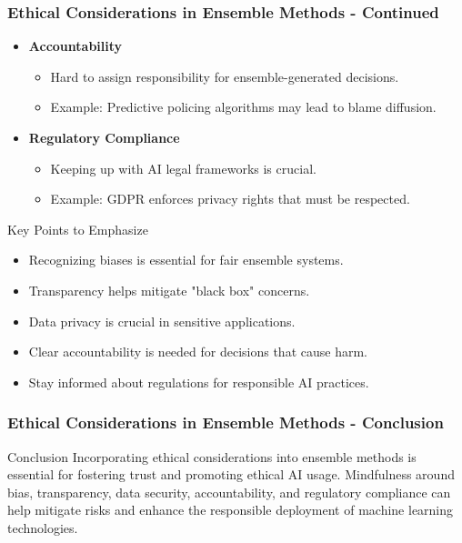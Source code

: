 \documentclass[aspectratio=169]{beamer}
\begin{document}
\begin{frame}[fragile]
    \frametitle{Ethical Considerations in Ensemble Methods - Continued}
    \begin{itemize}
        \item \textbf{Accountability}
        \begin{itemize}
            \item Hard to assign responsibility for ensemble-generated decisions.
            \item Example: Predictive policing algorithms may lead to blame diffusion.
        \end{itemize}
        
        \item \textbf{Regulatory Compliance}
        \begin{itemize}
            \item Keeping up with AI legal frameworks is crucial.
            \item Example: GDPR enforces privacy rights that must be respected.
        \end{itemize}
    \end{itemize}
    
    \begin{block}{Key Points to Emphasize}
        \begin{itemize}
            \item Recognizing biases is essential for fair ensemble systems.
            \item Transparency helps mitigate "black box" concerns.
            \item Data privacy is crucial in sensitive applications.
            \item Clear accountability is needed for decisions that cause harm.
            \item Stay informed about regulations for responsible AI practices.
        \end{itemize}
    \end{block}
\end{frame}

\begin{frame}[fragile]
    \frametitle{Ethical Considerations in Ensemble Methods - Conclusion}
    \begin{block}{Conclusion}
        Incorporating ethical considerations into ensemble methods is essential for fostering trust and promoting ethical AI usage. Mindfulness around bias, transparency, data security, accountability, and regulatory compliance can help mitigate risks and enhance the responsible deployment of machine learning technologies.
    \end{block}
\end{frame}
\end{document}
